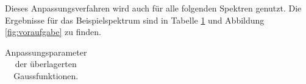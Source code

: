 Dieses Anpassungsverfahren wird auch für alle folgenden Spektren genutzt. Die Ergebnisse für das Beispielspektrum sind in Tabelle \ref{tab:voraufgabe} und Abbildung \ref{fig:voraufgabe} zu finden.

\begin{table}[h]
    \centering
    \begin{tabular}{|c|c|c|c|c|} \hline
    
    \end{tabular}
    \caption{Anpassungsparameter der überlagerten Gaussfunktionen.}
    \label{tab:voraufgabe}
\end{table}

